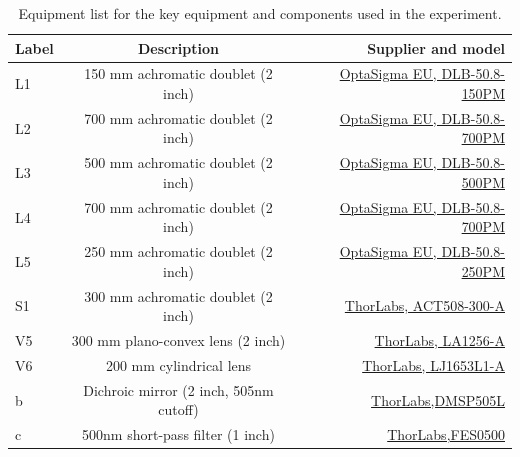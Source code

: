\begin{landscape}
\begin{table}%
\centering
\caption{\label{tab:Apparatus list}%
Equipment list for the key equipment and components used in the experiment.
}
\begin{tabular}{lcr}
\hline\hline
Label & Description & Supplier and model \\
\hline
L1 & 150 mm achromatic doublet (2 inch) & \href{https://www.optosigma.com/eu_en/optics/lenses/achromatic-lenses/achromatic-doublet-50-8mm-diameter-150-7mm-focal-length-DLB-50.8-150PM.html}{OptaSigma EU, DLB-50.8-150PM}\\
L2 & 700 mm achromatic doublet (2 inch) & \href{https://www.optosigma.com/eu_en/optics/lenses/achromatic-lenses/achromatic-doublet-50-8mm-diameter-700mm-focal-length-DLB-50.8-700PM.html}{OptaSigma EU, DLB-50.8-700PM}\\
L3 & 500 mm achromatic doublet (2 inch) & \href{https://www.optosigma.com/eu_en/optics/lenses/achromatic-lenses/achromatic-doublet-50-8mm-diameter-500-3mm-focal-length-DLB-50.8-500PM.html}{OptaSigma EU, DLB-50.8-500PM}\\
L4 & 700 mm achromatic doublet (2 inch) & \href{https://www.optosigma.com/eu_en/optics/lenses/achromatic-lenses/achromatic-doublet-50-8mm-diameter-700mm-focal-length-DLB-50.8-700PM.html}{OptaSigma EU, DLB-50.8-700PM}\\
L5 & 250 mm achromatic doublet (2 inch) & \href{https://www.optosigma.com/eu_en/optics/lenses/achromatic-lenses/achromatic-doublet-50-8mm-diameter-249-4mm-focal-length-DLB-50.8-250PM.html}{OptaSigma EU, DLB-50.8-250PM}\\
S1 & 300 mm achromatic doublet (2 inch) & \href{https://www.thorlabs.com/newgrouppage9.cfm?objectgroup_id=120}{ThorLabs, ACT508-300-A}\\
V5 & 300 mm plano-convex lens (2 inch) & \href{https://www.thorlabs.com/thorproduct.cfm?partnumber=LA1256-A}{ThorLabs, LA1256-A}\\
V6 & 200 mm cylindrical lens & \href{https://www.thorlabs.com/thorproduct.cfm?partnumber=LJ1653L1-A}{ThorLabs, LJ1653L1-A}\\
\hline
b & Dichroic mirror (2 inch, 505nm cutoff) & \href{https://www.thorlabs.com/thorproduct.cfm?partnumber=DMSP505L}{ThorLabs,DMSP505L}\\
c & 500nm short-pass filter (1 inch) & \href{https://www.thorlabs.com/thorproduct.cfm?partnumber=FES0500}{ThorLabs,FES0500}\\

\end{tabular}
\end{table}
\end{landscape}
